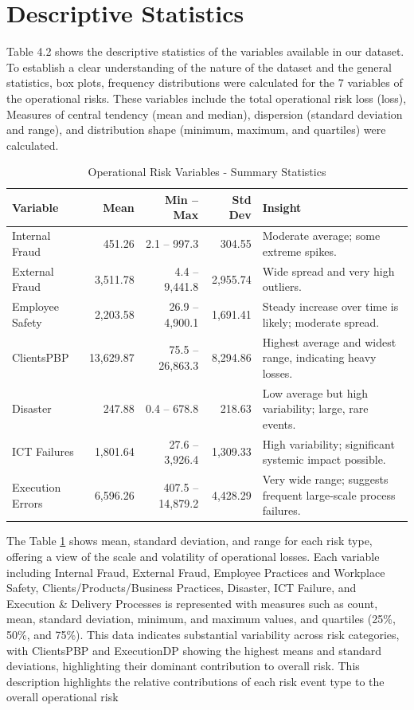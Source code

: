 \section{Descriptive Statistics}
Table 4.2 shows the descriptive statistics of the variables available in our dataset. To establish a clear understanding of the nature of the dataset and the general statistics, box plots, frequency distributions were calculated for the 7 variables of the operational risks. These variables include the total operational risk loss (loss), Measures of central tendency (mean and median), dispersion (standard deviation and range), and distribution shape (minimum, maximum, and quartiles) were calculated.
\begin{table}[H]
\centering
\begin{tabular}{|l|r|r|r|p{5cm}|}
\hline
\rowcolor{gray!20}
\textbf{Variable} & \textbf{Mean} & \textbf{Min -- Max} & \textbf{Std Dev} & \textbf{Insight} \\
\hline
Internal Fraud  & 451.26 & 2.1 -- 997.3 & 304.55 & Moderate average; some extreme spikes. \\
External Fraud  & 3,511.78 & 4.4 -- 9,441.8 & 2,955.74 & Wide spread and very high outliers. \\
Employee Safety  & 2,203.58 & 26.9 -- 4,900.1 & 1,691.41 & Steady increase over time is likely; moderate spread. \\
ClientsPBP & 13,629.87 & 75.5 -- 26,863.3 & 8,294.86 & Highest average and widest range, indicating heavy losses. \\
Disaster & 247.88 & 0.4 -- 678.8 & 218.63 & Low average but high variability; large, rare events. \\
ICT Failures & 1,801.64 & 27.6 -- 3,926.4 & 1,309.33 & High variability; significant systemic impact possible. \\
Execution Errors  & 6,596.26 & 407.5 -- 14,879.2 & 4,428.29 & Very wide range; suggests frequent large-scale process failures. \\
\hline
\end{tabular}
\caption{Operational Risk Variables - Summary Statistics}
\label{tab:Operational Risk Variables - Summary Statistics}
\end{table}


The Table \ref{tab:Operational Risk Variables - Summary Statistics} shows mean, standard deviation, and range for each risk type, offering a view of the scale and volatility of operational losses. Each variable including Internal Fraud, External Fraud, Employee Practices and Workplace Safety, Clients/Products/Business Practices, Disaster, ICT Failure, and Execution \& Delivery Processes is represented with measures such as count, mean, standard deviation, minimum, and maximum values, and quartiles (25\%, 50\%, and 75\%). This data indicates substantial variability across risk categories, with ClientsPBP and ExecutionDP showing the highest means and standard deviations, highlighting their dominant contribution to overall risk. This description highlights the relative contributions of each risk event type to the overall operational risk

